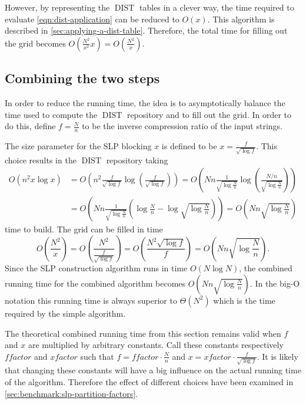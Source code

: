 \documentclass[twoside,11pt,openright]{report}
\newcommand{\DIST}{\operatorname{DIST}}
\newcommand{\xfactor}{\ensuremath{\mathit{xfactor}}}
\newcommand{\ffactor}{\ensuremath{\mathit{ffactor}}}
\begin{document}
However, by representing the $\DIST$ tables in a clever way, the time required to evaluate \cref{eqn:dist-application} can be reduced to $O(x)$. This algorithm is described in \cref{sec:applying-a-dist-table}. Therefore, the total time for filling out the grid becomes $O\left( \frac{N^2}{x^2}x \right) = O\left( \frac{N^2}{x} \right)$.

\subsection{Combining the two steps}
\label{sec:combining-the-two-steps}
In order to reduce the running time, the idea is to asymptotically balance the time used to compute the $\DIST$ repository and to fill out the grid. In order to do this, define $f = \frac{N}{n}$ to be the inverse compression ratio of the input strings.

The size parameter for the SLP blocking $x$ is defined to be $x = \frac{f}{\sqrt{\log{f}}}$. This choice results in the $\DIST$ repository taking
\begin{align*}
  O(n^2 x\log{x})
    &= O\left( n^2 \frac{f}{\sqrt{\log{f}}} \log\left( \frac{f}{\sqrt{\log{f}}} \right) \right)
    = O\left( Nn \frac{1}{\sqrt{\log{\frac{N}{n}}}} \log\left( \frac{N/n}{\sqrt{\log{\frac{N}{n}}}} \right) \right) \\
    &= O\left( Nn \frac{1}{\sqrt{\log{\frac{N}{n}}}} \left( \log{\frac{N}{n}} - \log{\sqrt{\log{\frac{N}{n}}}} \right) \right)
    = O\left( Nn\sqrt{\log{\frac{N}{n}}} \right)
\end{align*}
time to build. The grid can be filled in time
\[
  O\left(\frac{N^2}{x}\right)
    = O\left( \frac{N^2}{\frac{f}{\sqrt{\log{f}}}} \right)
    = O\left( \frac{N^2 \sqrt{\log{f}}}{f} \right)
    = O\left( Nn\sqrt{\log{\frac{N}{n}}} \right).
\]
Since the SLP construction algorithm runs in time $O(N\log{N})$, the combined running time for the combined algorithm becomes $O\left( Nn\sqrt{\log{\frac{N}{n}}} \right)$. In the big-O notation this running time is always superior to $\Theta(N^2)$ which is the time required by the simple algorithm.

The theoretical combined running time from this section remains valid when $f$ and $x$ are multiplied by arbitrary constants. Call these constants respectively $\ffactor$ and $\xfactor$ such that $f = \ffactor \cdot \frac{N}{n}$ and $x = \xfactor \cdot \frac{f}{\sqrt{\log{f}}}$. It is likely that changing these constants will have a big influence on the actual running time of the algorithm. Therefore the effect of different choices have been examined in \cref{sec:benchmark:slp-partition-factors}.
\end{document}
